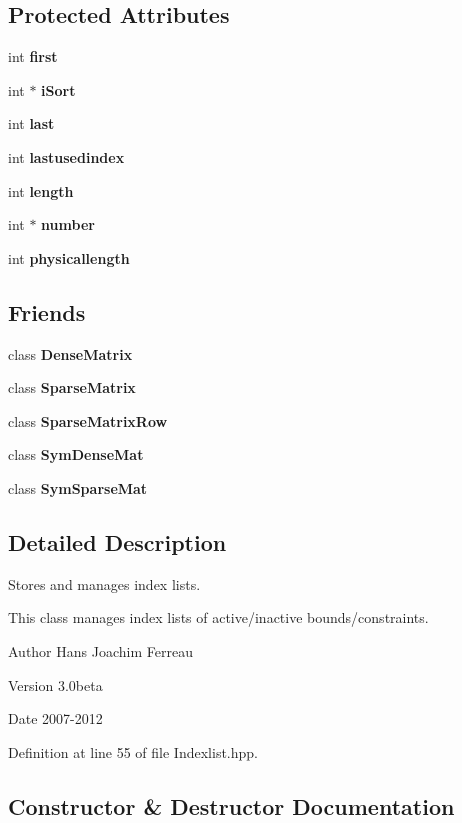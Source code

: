 \subsection*{Protected Attributes}
\begin{DoxyCompactItemize}
\item 
int {\bf first}
\item 
int $\ast$ {\bf iSort}
\item 
int {\bf last}
\item 
int {\bf lastusedindex}
\item 
int {\bf length}
\item 
int $\ast$ {\bf number}
\item 
int {\bf physicallength}
\end{DoxyCompactItemize}
\subsection*{Friends}
\begin{DoxyCompactItemize}
\item 
class {\bf DenseMatrix}
\item 
class {\bf SparseMatrix}
\item 
class {\bf SparseMatrixRow}
\item 
class {\bf SymDenseMat}
\item 
class {\bf SymSparseMat}
\end{DoxyCompactItemize}


\subsection{Detailed Description}
Stores and manages index lists. 

This class manages index lists of active/inactive bounds/constraints.

\begin{DoxyAuthor}{Author}
Hans Joachim Ferreau 
\end{DoxyAuthor}
\begin{DoxyVersion}{Version}
3.0beta 
\end{DoxyVersion}
\begin{DoxyDate}{Date}
2007-\/2012 
\end{DoxyDate}


Definition at line 55 of file Indexlist.hpp.



\subsection{Constructor \& Destructor Documentation}
